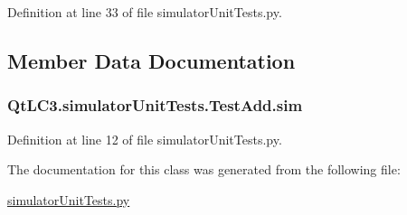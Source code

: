 Definition at line 33 of file simulator\-Unit\-Tests.\-py.



\subsection{Member Data Documentation}
\hypertarget{class_qt_l_c3_1_1simulator_unit_tests_1_1_test_add_a409a87002e770e61fc298ec7a3a1b9b3}{
\subsubsection[{sim}]{\setlength{\rightskip}{0pt plus 5cm}Qt\-L\-C3.\-simulator\-Unit\-Tests.\-Test\-Add.\-sim}}\label{class_qt_l_c3_1_1simulator_unit_tests_1_1_test_add_a409a87002e770e61fc298ec7a3a1b9b3}


Definition at line 12 of file simulator\-Unit\-Tests.\-py.



The documentation for this class was generated from the following file\-:\begin{DoxyCompactItemize}
\item 
\hyperlink{simulator_unit_tests_8py}{simulator\-Unit\-Tests.\-py}\end{DoxyCompactItemize}
